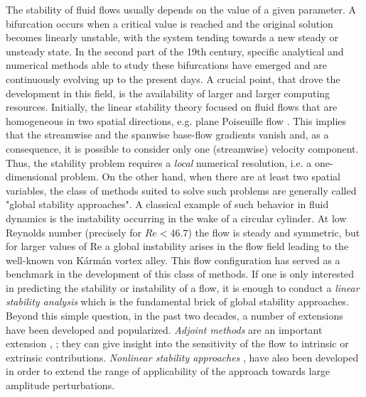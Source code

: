 \documentclass[twocolumn,10pt]{asme2ej}
\begin{document}
The stability of fluid flows usually depends on the value of a given parameter. A bifurcation occurs when a critical value is reached and the original solution becomes linearly unstable, with the system tending towards a new steady or unsteady state. 
In the second part of the 19th century, specific analytical and numerical methods able to study these bifurcations have emerged and are continuously evolving up to the present days. 
A crucial point, that drove the development in this field, is the availability of larger and larger computing resources. 
Initially, the linear stability theory focused on fluid flows that are homogeneous in two spatial directions, e.g. plane Poiseuille flow \cite{Dreid2004}. This implies that the streamwise and the spanwise base-flow gradients vanish and, as a consequence, it is possible to consider only one (streamwise) velocity component. Thus, the stability problem requires a \textit{local} numerical resolution, i.e. a one-dimensional problem.
On the other hand,  when there are at least two spatial variables, the class of methods suited to solve such problems are generally called "global stability approaches".
A classical example of such behavior in fluid dynamics is the instability occurring in the wake of a circular cylinder. At low Reynolds number (precisely for $Re < 46.7$) the flow is steady and symmetric, but for larger values of Re a global instability arises in the flow field leading to the well-known von K\'arm\'an vortex alley. 
This flow configuration has served as a benchmark in the development of this class of methods.  
If one is only interested in predicting the stability or instability of a flow, it is enough to conduct a {\em linear stability analysis} which is the fundamental brick of global stability approaches. 
Beyond this simple question, in the past two decades, a number of extensions have been developed and popularized.  {\em Adjoint methods} are an important extension \cite{GiannettiLuchini},\cite{Marquet} ; they can give insight into the sensitivity of the flow to intrinsic or extrinsic contributions. 
{\em Nonlinear stability approaches} \cite{MLugo2014}, \cite{SippLebedev} have also been developed in order to extend the range of applicability of the approach towards large amplitude perturbations.
\end{document}
